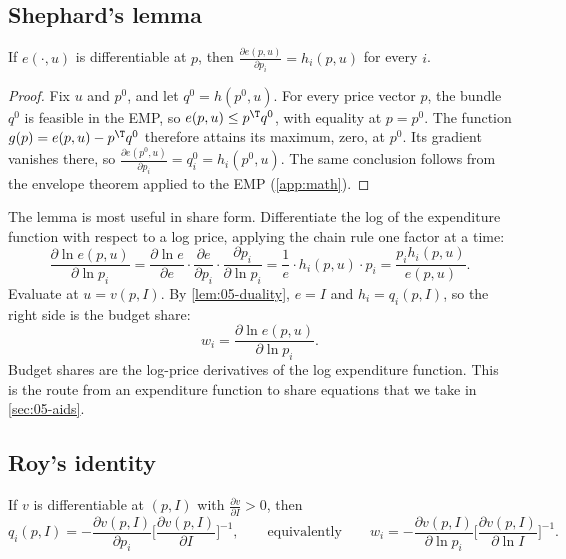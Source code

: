 \subsection{Shephard's lemma}\label{sec:05-shephard}

\begin{proposition}\label{prop:05-shephard}
If $e(\cdot, u)$ is differentiable at $p$, then $\frac{\partial e(p,u)}{\partial p_i} = h_i(p, u)$ for every
$i$.
\end{proposition}

\begin{proof}
Fix $u$ and $p^0$, and let $q^0 = h(p^0, u)$. For every price vector $p$, the bundle $q^0$ is feasible in the
EMP, so $e(p, u) \leq p^\T q^0$, with equality at $p = p^0$. The function $g(p) = e(p, u) - p^\T q^0$
therefore attains its maximum, zero, at $p^0$. Its gradient vanishes there, so
$\frac{\partial e(p^0, u)}{\partial p_i} = q^0_i = h_i(p^0, u)$. The same conclusion follows from the
envelope theorem applied to the EMP (\cref{app:math}).
\end{proof}

The lemma is most useful in share form. Differentiate the log of the expenditure function with respect to a
log price, applying the chain rule one factor at a time:
\begin{equation*}
\frac{\partial\ln e(p, u)}{\partial\ln p_i}
= \frac{\partial\ln e}{\partial e}\cdot\frac{\partial e}{\partial p_i}\cdot\frac{\partial p_i}{\partial\ln p_i}
= \frac{1}{e}\cdot h_i(p, u)\cdot p_i
= \frac{p_ih_i(p, u)}{e(p, u)} .
\end{equation*}
Evaluate at $u = v(p, I)$. By \cref{lem:05-duality}, $e = I$ and $h_i = q_i(p, I)$, so the right side is the
budget share:
\begin{equation}\label{eq:05-shephard-share}
w_i = \frac{\partial\ln e(p, u)}{\partial\ln p_i} .
\end{equation}
Budget shares are the log-price derivatives of the log expenditure function. This is the route from an
expenditure function to share equations that we take in \cref{sec:05-aids}.

\subsection{Roy's identity}\label{sec:05-roy}

\begin{proposition}\label{prop:05-roy}
If $v$ is differentiable at $(p, I)$ with $\frac{\partial v}{\partial I} > 0$, then
\begin{equation}\label{eq:05-roy}
q_i(p, I) = -\frac{\partial v(p, I)}{\partial p_i}\Big[\frac{\partial v(p, I)}{\partial I}\Big]^{-1},
\qquad\text{equivalently}\qquad
w_i = -\frac{\partial v(p, I)}{\partial\ln p_i}\Big[\frac{\partial v(p, I)}{\partial\ln I}\Big]^{-1} .
\end{equation}
\end{proposition}

